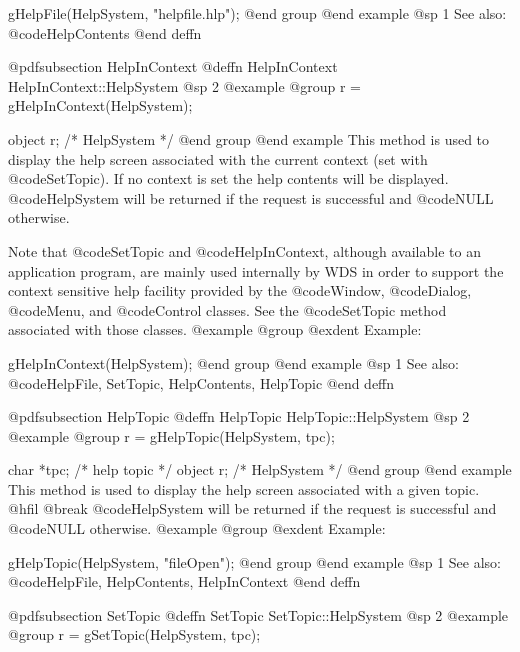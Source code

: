 gHelpFile(HelpSystem, "helpfile.hlp");
@end group
@end example
@sp 1
See also:  @code{HelpContents}
@end deffn














@pdfsubsection {HelpInContext}
@deffn {HelpInContext} HelpInContext::HelpSystem
@sp 2
@example
@group
r = gHelpInContext(HelpSystem);

object  r;      /*  HelpSystem  */
@end group
@end example
This method is used to display the help screen associated with the
current context (set with @code{SetTopic}).  If no context is set the
help contents will be displayed.  @code{HelpSystem} will be returned if
the request is successful and @code{NULL} otherwise.

Note that @code{SetTopic} and @code{HelpInContext}, although available
to an application program, are mainly used internally by WDS in order to
support the context sensitive help facility provided by the @code{Window},
@code{Dialog}, @code{Menu}, and @code{Control} classes.  See the
@code{SetTopic} method associated with those classes.
@example
@group
@exdent Example:

gHelpInContext(HelpSystem);
@end group
@end example
@sp 1
See also:  @code{HelpFile, SetTopic, HelpContents, HelpTopic}
@end deffn







@pdfsubsection {HelpTopic}
@deffn {HelpTopic} HelpTopic::HelpSystem
@sp 2
@example
@group
r = gHelpTopic(HelpSystem, tpc);

char    *tpc;   /*  help topic  */
object  r;      /*  HelpSystem  */
@end group
@end example
This method is used to display the help screen associated with a given topic.
@hfil @break @code{HelpSystem} will be returned if the request is successful
and @code{NULL} otherwise.
@example
@group
@exdent Example:

gHelpTopic(HelpSystem, "fileOpen");
@end group
@end example
@sp 1
See also:  @code{HelpFile, HelpContents, HelpInContext}
@end deffn














@pdfsubsection {SetTopic}
@deffn {SetTopic} SetTopic::HelpSystem
@sp 2
@example
@group
r = gSetTopic(HelpSystem, tpc);

